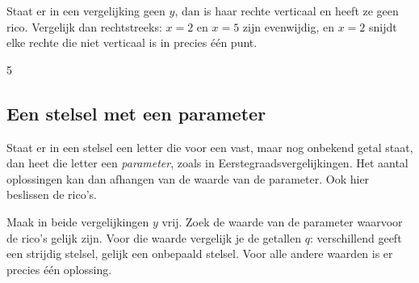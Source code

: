 Staat er in een vergelijking geen $y$, dan is haar rechte verticaal en heeft ze geen rico. Vergelijk dan rechtstreeks: $x = 2$ en $x = 5$ zijn evenwijdig, en $x = 2$ snijdt elke rechte die niet verticaal is in precies één punt.

\begin{oefeningen}
\end{oefeningen}

\begin{alleenvoor}{5}
\subsection{Een stelsel met een parameter}

Staat er in een stelsel een letter die voor een vast, maar nog onbekend getal staat, dan heet die letter een \textit{parameter}, zoals in Eerstegraadsvergelijkingen. Het aantal oplossingen kan dan afhangen van de waarde van de parameter. Ook hier beslissen de rico's.


\begin{werkwijze}
Maak in beide vergelijkingen $y$ vrij. Zoek de waarde van de parameter waarvoor de rico's gelijk zijn. Voor die waarde vergelijk je de getallen $q$: verschillend geeft een strijdig stelsel, gelijk een onbepaald stelsel. Voor alle andere waarden is er precies één oplossing.
\end{werkwijze}

\begin{oefeningen}
\end{oefeningen}
\end{alleenvoor}

